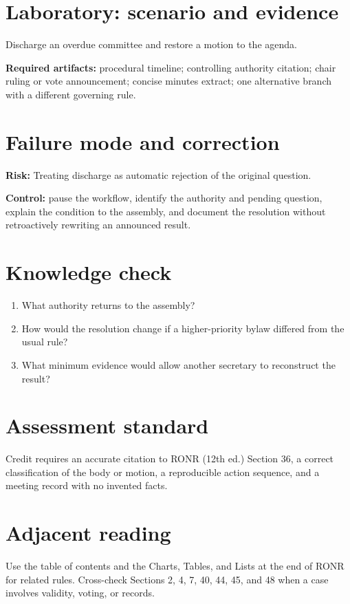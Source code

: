 \documentclass[11pt]{article}
\begin{document}
\section{Laboratory: scenario and evidence}
Discharge an overdue committee and restore a motion to the agenda.

\textbf{Required artifacts:} procedural timeline; controlling authority citation; chair ruling or vote announcement; concise minutes extract; one alternative branch with a different governing rule.

\section{Failure mode and correction}
\textbf{Risk:} Treating discharge as automatic rejection of the original question.

\textbf{Control:} pause the workflow, identify the authority and pending question, explain the condition to the assembly, and document the resolution without retroactively rewriting an announced result.

\section{Knowledge check}
\begin{enumerate}[leftmargin=*,itemsep=4pt]
\item What authority returns to the assembly?
\item How would the resolution change if a higher-priority bylaw differed from the usual rule?
\item What minimum evidence would allow another secretary to reconstruct the result?
\end{enumerate}

\section{Assessment standard}
Credit requires an accurate citation to RONR (12th ed.) Section 36, a correct classification of the body or motion, a reproducible action sequence, and a meeting record with no invented facts.

\section{Adjacent reading}
Use the table of contents and the Charts, Tables, and Lists at the end of RONR for related rules. Cross-check Sections 2, 4, 7, 40, 44, 45, and 48 when a case involves validity, voting, or records.
\end{document}
